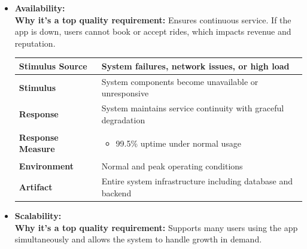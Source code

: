 \documentclass[12pt]{article}
\begin{document}
\begin{itemize}
  \item \textbf{Availability:} \\
  \textbf{Why it's a top quality requirement:} Ensures continuous service. If the app is down, users cannot book or accept rides, which impacts revenue and reputation. \\

\begin{table}[H]
\centering
\begin{tabular}{|l|p{10cm}|}
\hline
\textbf{Stimulus Source} & System failures, network issues, or high load \\
\hline
\textbf{Stimulus} & System components become unavailable or unresponsive \\
\hline
\textbf{Response} & System maintains service continuity with graceful degradation \\
\hline
\textbf{Response Measure} & 
\begin{itemize}
  \item 99.5\% uptime under normal usage
\end{itemize} \\
\hline
\textbf{Environment} & Normal and peak operating conditions \\
\hline
\textbf{Artifact} & Entire system infrastructure including database and backend \\
\hline
\end{tabular}
\end{table}
  
  \item \textbf{Scalability:} \\
  \textbf{Why it's a top quality requirement:} Supports many users using the app simultaneously and allows the system to handle growth in demand. \\


\end{itemize}
\end{document}
